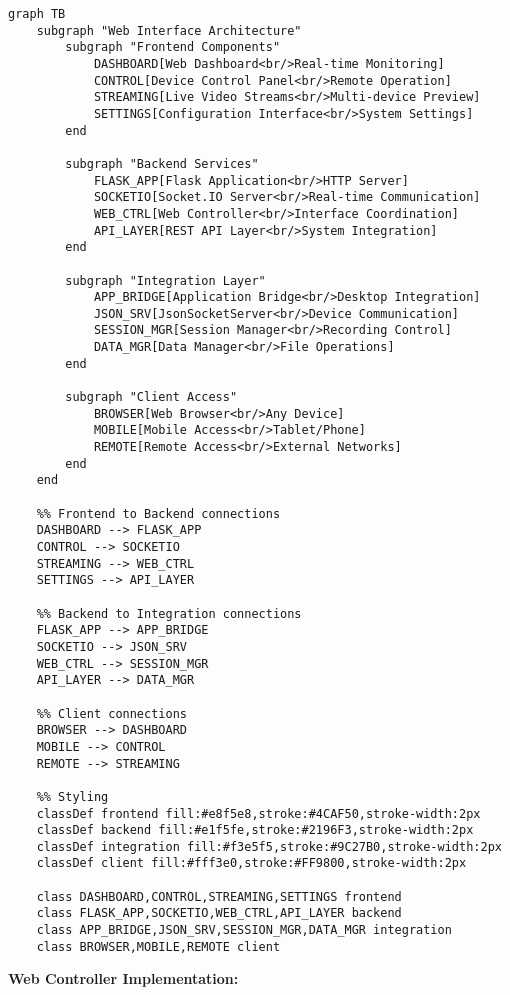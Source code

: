 \documentclass[11pt,a4paper]{article}
\begin{document}
\begin{verbatim}
graph TB
    subgraph "Web Interface Architecture"
        subgraph "Frontend Components"
            DASHBOARD[Web Dashboard<br/>Real-time Monitoring]
            CONTROL[Device Control Panel<br/>Remote Operation]
            STREAMING[Live Video Streams<br/>Multi-device Preview]
            SETTINGS[Configuration Interface<br/>System Settings]
        end

        subgraph "Backend Services"
            FLASK_APP[Flask Application<br/>HTTP Server]
            SOCKETIO[Socket.IO Server<br/>Real-time Communication]
            WEB_CTRL[Web Controller<br/>Interface Coordination]
            API_LAYER[REST API Layer<br/>System Integration]
        end

        subgraph "Integration Layer"
            APP_BRIDGE[Application Bridge<br/>Desktop Integration]
            JSON_SRV[JsonSocketServer<br/>Device Communication]
            SESSION_MGR[Session Manager<br/>Recording Control]
            DATA_MGR[Data Manager<br/>File Operations]
        end

        subgraph "Client Access"
            BROWSER[Web Browser<br/>Any Device]
            MOBILE[Mobile Access<br/>Tablet/Phone]
            REMOTE[Remote Access<br/>External Networks]
        end
    end

    %% Frontend to Backend connections
    DASHBOARD --> FLASK_APP
    CONTROL --> SOCKETIO
    STREAMING --> WEB_CTRL
    SETTINGS --> API_LAYER

    %% Backend to Integration connections
    FLASK_APP --> APP_BRIDGE
    SOCKETIO --> JSON_SRV
    WEB_CTRL --> SESSION_MGR
    API_LAYER --> DATA_MGR

    %% Client connections
    BROWSER --> DASHBOARD
    MOBILE --> CONTROL
    REMOTE --> STREAMING

    %% Styling
    classDef frontend fill:#e8f5e8,stroke:#4CAF50,stroke-width:2px
    classDef backend fill:#e1f5fe,stroke:#2196F3,stroke-width:2px
    classDef integration fill:#f3e5f5,stroke:#9C27B0,stroke-width:2px
    classDef client fill:#fff3e0,stroke:#FF9800,stroke-width:2px

    class DASHBOARD,CONTROL,STREAMING,SETTINGS frontend
    class FLASK_APP,SOCKETIO,WEB_CTRL,API_LAYER backend
    class APP_BRIDGE,JSON_SRV,SESSION_MGR,DATA_MGR integration
    class BROWSER,MOBILE,REMOTE client
\end{verbatim}

\textbf{Web Controller Implementation:}
\end{document}
